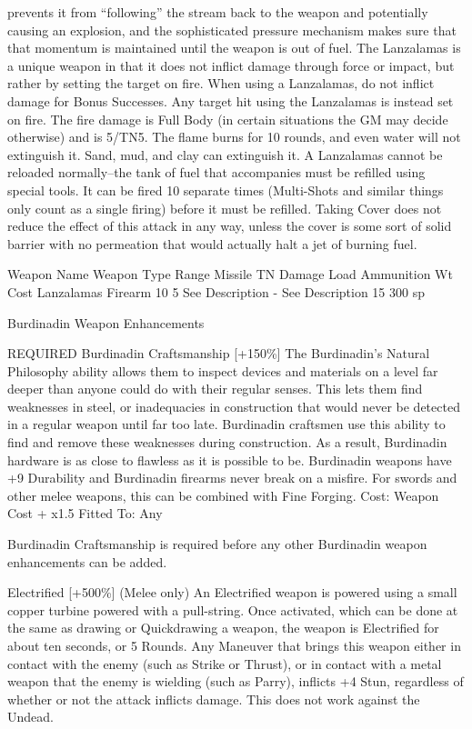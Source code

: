 \documentclass[oneside,11pt,english]{book}
\begin{document}
prevents it from “following” the stream back to the weapon and potentially causing an explosion, and the 
sophisticated pressure mechanism makes sure that that momentum is maintained until the weapon is out 
of fuel. 
The Lanzalamas is a unique weapon in that it does not inflict damage through force or impact, but rather 
by setting the target on fire. When using a Lanzalamas, do not inflict damage for Bonus Successes. Any 
target hit using the Lanzalamas is instead set on fire. The fire damage is Full Body (in certain situations 
the GM may decide otherwise) and is 5/TN5. The flame burns for 10 rounds, and even water will not 
extinguish it. Sand, mud, and clay can extinguish it. 
A Lanzalamas cannot be reloaded normally--the tank of fuel that accompanies must be refilled using 
special tools. It can be fired 10 separate times (Multi-Shots and similar things only count as a single 
firing) before it must be refilled. 
Taking Cover does not reduce the effect of this attack in any way, unless the cover is some sort of solid 
barrier with no permeation that would actually halt a jet of burning fuel. 

 

 

Weapon Name Weapon Type Range Missile TN Damage Load Ammunition Wt Cost 
Lanzalamas Firearm 10 5 See Description - See Description 15 300 sp 

 

 

Burdinadin Weapon Enhancements 

 

REQUIRED Burdinadin Craftsmanship [+150\%] 
The Burdinadin’s Natural Philosophy ability allows them to inspect devices and materials on a level far 
deeper than anyone could do with their regular senses. This lets them find weaknesses in steel, or 
inadequacies in construction that would never be detected in a regular weapon until far too late. 
Burdinadin craftsmen use this ability to find and remove these weaknesses during construction. 
As a result, Burdinadin hardware is as close to flawless as it is possible to be. Burdinadin weapons have 
+9 Durability and Burdinadin firearms never break on a misfire. For swords and other melee weapons, 
this can be combined with Fine Forging. 
Cost: Weapon Cost + x1.5 
Fitted To: Any 

 

Burdinadin Craftsmanship is required before any other Burdinadin weapon enhancements can be added. 
 
Electrified [+500\%] (Melee only) 
An Electrified weapon is powered using a small copper turbine powered with a pull-string. Once 
activated, which can be done at the same as drawing or Quickdrawing a weapon, the weapon is Electrified 
for about ten seconds, or 5 Rounds. Any Maneuver that brings this weapon either in contact with the 
enemy (such as Strike or Thrust), or in contact with a metal weapon that the enemy is wielding (such as 
Parry), inflicts +4 Stun, regardless of whether or not the attack inflicts damage. This does not work 
against the Undead. 
\end{document}
